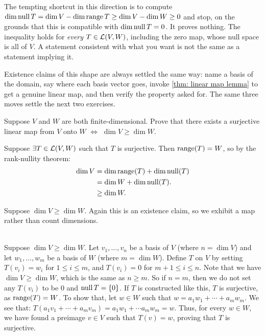 \begin{ainote}
  The tempting shortcut in this direction is to compute $\dim \operatorname{null} T = \dim V - \dim \operatorname{range} T \geq \dim V - \dim W \geq 0$ and stop, on the grounds that this is compatible with $\dim \operatorname{null} T = 0$. It proves nothing. The inequality holds for \emph{every} $T \in \mathcal{L}(V,W)$, including the zero map, whose null space is all of $V$. A statement consistent with what you want is not the same as a statement implying it.

  Existence claims of this shape are always settled the same way: name a basis of the domain, say where each basis vector goes, invoke \ref{thm: linear map lemma} to get a genuine linear map, and then verify the property asked for. The same three moves settle the next two exercises.
\end{ainote}


\begin{xrcs}
  Suppose $V$ and $W$ are both finite-dimensional. Prove that there exists a surjective linear map from $V$ onto $W$ $\iff$ $\dim V \geq \dim W$.

  \begin{xprf}
    \Rightarrowdirection Suppose $\exists T \in \mathcal{L}(V,W)$ such that $T$ is surjective. Then $\operatorname{range}(T) = W$, so by the rank-nullity theorem:
    \begin{equation}
      \begin{aligned}
        \dim V &=    \dim \operatorname{range}(T) + \dim \operatorname{null}(T) \\
        &=    \dim W + \dim \operatorname{null}(T). \\
        &\geq \dim W.
      \end{aligned}
    \end{equation}

    \Leftarrowdirection Suppose $\dim V \geq \dim W$. Again this is an existence claim, so we exhibit a map rather than count dimensions.

     \\
    Suppose $\dim V \geq \dim W$. Let $v_1, \dots, v_n$ be a basis of $V$ (where $n = \dim V$) and let $w_1, \dots, w_m$ be a basis of $W$ (where $m = \dim W$).  Define $T$ on $V$ by setting $T(v_i) = w_i$ for $1 \leq i \leq m$, and $T(v_i) = 0$ for $m+1 \leq i \leq n$. Note that we have $\dim V \geq \dim W$, which is the same as $n \geq m$. So if $n = m$, then we do not set any $T(v_i)$ to be $0$ and $\operatorname{null} T = \{0\}$. If $T$ is constructed like this, $T$ is surjective, as $\operatorname{range}(T) = W$. To show that, let $w \in W$ such that
    $
    w = a_1 w_1 + \cdots + a_m w_m.
    $
    We see that: $T(a_1 v_1 + \cdots + a_m v_m)= a_1 w_1 + \cdots a_m w_m = w$. Thus, for every $w \in W$, we have found a preimage $v \in V$ such that $T(v) = w$, proving that $T$ is surjective.
  \end{xprf}
\end{xrcs}



